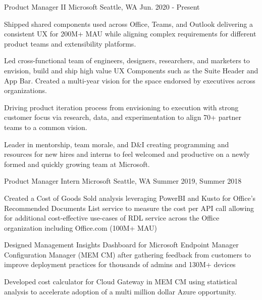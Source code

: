 

\begin{cventries}

  \cventry
    {Product Manager II} %
    {Microsoft} %
    {} %
    {Seattle, WA} %
    {Jun. 2020 - Present} %
    {
      \begin{cvitems} %
        \item {Shipped shared components used across Office, Teams, and Outlook delivering a consistent UX for 200M+ MAU while aligning complex requirements for different product teams and extensibility platforms.}
        \item{Led cross-functional team of engineers, designers, researchers, and marketers to envision, build and ship high value UX Components such as the Suite Header and App Bar. Created a multi-year vision for the space endorsed by executives across organizations.}
        \item {Driving product iteration process from envisioning to execution with strong customer focus via research, data, and experimentation to align 70+ partner teams to a common vision.}
        \item{Leader in mentorship, team morale, and D\&I creating programming and resources for new hires and interns to feel welcomed and productive on a newly formed and quickly growing team at Microsoft.}
      \end{cvitems}
    }

  \cventry
    {Product Manager Intern} %
    {Microsoft} %
    {} %
    {Seattle, WA} %
    {Summer 2019, Summer 2018} %
    {
      \begin{cvitems} %
        \item {Created a Cost of Goods Sold analysis leveraging PowerBI and Kusto for Office's Recommended Documents List service to measure the cost per API call allowing for additional cost-effective use-cases of RDL service across the Office organization including Office.com (100M+ MAU)}
        \item {Designed Management Insights Dashboard for Microsoft Endpoint Manager Configuration Manager (MEM CM) after gathering feedback from customers to improve deployment practices for thousands of admins and 130M+ devices}
        \item {Developed cost calculator for Cloud Gateway in MEM CM using statistical analysis to accelerate adoption of a multi million dollar Azure opportunity.}
      \end{cvitems}
    }


\end{cventries}
